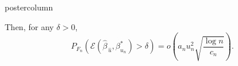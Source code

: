 \documentclass[final]{beamer}
\renewcommand{\hat}{\widehat}
\newcommand{\vsp}{\vspace{.2in}}
\begin{document}
\begin{frame}
\begin{columns}
\begin{column}{.49\textwidth}
\begin{beamercolorbox}[center,wd=\textwidth]{postercolumn}
\begin{minipage}[T]{.96\textwidth}
{            \vsp
            Then, for any $\delta > 0$,
            \[
            P_{F_n} \left( \mathcal{E}\left(\hat\beta_{\,\widehat{u}},\beta^*_{u_n} \right) >
              \delta \right) = o\left( a_n u_n^2\sqrt{ \frac{ \log 
                  n}{c_n} }\right).
            \]
            \vfill
          }
        \end{minipage}
      \end{beamercolorbox}
    \end{column}
  \end{columns}
\end{frame}
\end{document}
